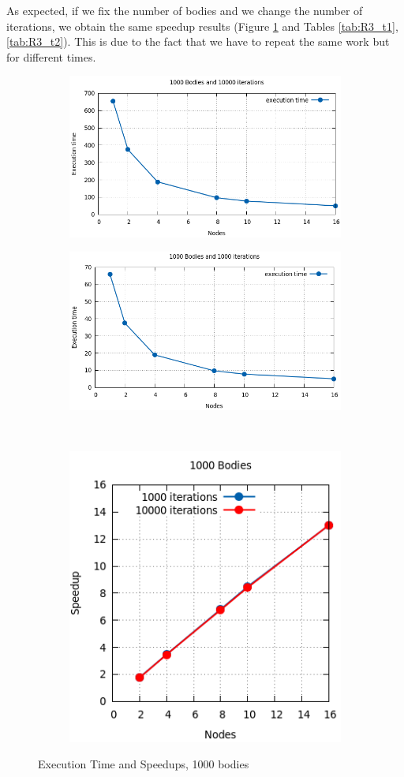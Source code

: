 \documentclass[a4paper]{article}
\begin{document}
As expected, if we fix the number of bodies and we change the number of iterations, we obtain the same speedup results (Figure \ref{fig:R3} and Tables \ref{tab:R3_t1}, \ref{tab:R3_t2}). This is due to the fact that we have to repeat the same work but for different times.

\begin{figure}[ht]
\begin{subfigure}{.5\textwidth}
  \centering
  \includegraphics[width=1\linewidth]{results/graph19}
\end{subfigure} %
\begin{subfigure}{.5\textwidth}
  \centering
  \includegraphics[width=1\linewidth]{results/graph17}
\end{subfigure} \\ %
\begin{subfigure}{\textwidth}
  \centering
  \includegraphics[width=.4\linewidth]{results/graph18}
\end{subfigure} 
  \caption{Execution Time and Speedups, 1000 bodies}
  \label{fig:R3}
\end{figure}
\FloatBarrier
\end{document}
